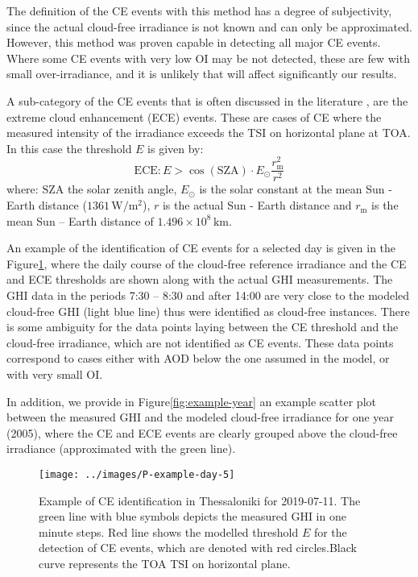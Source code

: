 \documentclass[preprint, 5p,
authoryear]{elsarticle} %
\begin{document}
The definition of the CE events with this method has a degree of
subjectivity, since the actual cloud-free irradiance is not known and
can only be approximated. However, this method was proven capable in
detecting all major CE events. Where some CE events with very low OI may
be not detected, these are few with small over-irradiance, and it is
unlikely that will affect significantly our results.

A sub-category of the CE events that is often discussed in the
literature \citep{Cordero2023, Martins2022, Yordanov2015}, are the
extreme cloud enhancement (ECE) events. These are cases of CE where the
measured intensity of the irradiance exceeds the TSI on horizontal plane
at TOA. In this case the threshold \(E\) is given by: \begin{equation}
\text{ECE}: E > \cos(\text{SZA}) \cdot E_{\odot} \frac{r^2_\text{m}} {r^2}
\label{eq:ECE}
\end{equation} where: \(\text{SZA}\) the solar zenith angle,
\(E_{\odot}\) is the solar constant at the mean Sun - Earth distance
(\(1361\,\text{W}/\text{m}^2\)), \(r\) is the actual Sun - Earth
distance and \(r_\text{m}\) is the mean Sun -- Earth distance of
\(1.496\times10^8\,\text{km}\).

An example of the identification of CE events for a selected day is
given in the Figure\nobreakspace{}\ref{fig:example-day}, where the daily
course of the cloud-free reference irradiance and the CE and ECE
thresholds are shown along with the actual GHI measurements. The GHI
data in the periods 7:30 -- 8:30 and after 14:00 are very close to the
modeled cloud-free GHI (light blue line) thus were identified as
cloud-free instances. There is some ambiguity for the data points laying
between the CE threshold and the cloud-free irradiance, which are not
identified as CE events. These data points correspond to cases either
with AOD below the one assumed in the model, or with very small OI.

In addition, we provide in Figure\nobreakspace{}\ref{fig:example-year}
an example scatter plot between the measured GHI and the modeled
cloud-free irradiance for one year (2005), where the CE and ECE events
are clearly grouped above the cloud-free irradiance (approximated with
the green line).

\begin{figure}[H]

{\centering \texttt{[image: ../images/P-example-day-5]} 

}

\caption{Example of CE identification in Thessaloniki for 2019-07-11. The green line with blue symbols depicts the measured GHI in one minute steps. Red line shows the modelled threshold $E$ for the detection of CE events, which are denoted with red circles.Black curve represents the TOA TSI on horizontal plane.}\label{fig:example-day}
\end{figure}
\end{document}
